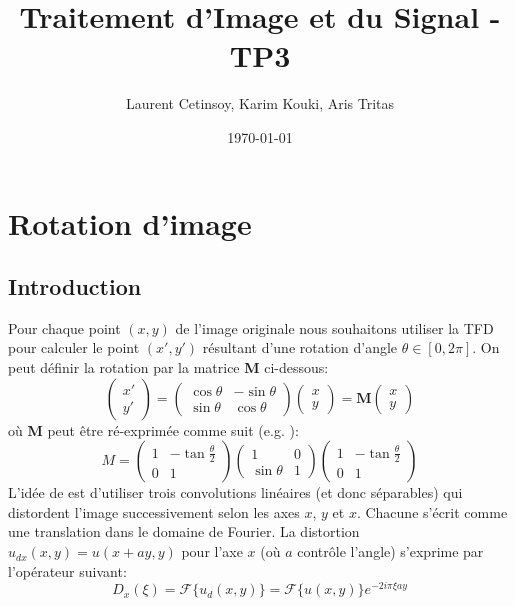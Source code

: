 \documentclass[12pt]{article}
\title{Traitement d'Image et du Signal - TP3}
\author{Laurent Cetinsoy, Karim Kouki, Aris Tritas }
\date{\today}
\begin{document}
\maketitle

\section{Rotation d'image}

\subsection{Introduction} 

Pour chaque point $(x, y)$ de l'image originale nous souhaitons utiliser la TFD pour calculer le point $(x', y')$ résultant d'une rotation d'angle  $\theta \in {[0, 2\pi]}$. On peut définir la rotation par la matrice \textbf{M} ci-dessous:
$$\begin{pmatrix}
x' \\ y'
\end{pmatrix}=
\begin{pmatrix}
\cos \theta & -\sin \theta \\
\sin \theta & \cos \theta
\end{pmatrix}
\begin{pmatrix}
x \\ y
\end{pmatrix}=\textbf{M}
\begin{pmatrix}
x \\ y
\end{pmatrix}
$$
où \textbf{M} peut être ré-exprimée comme suit (e.g. \cite{paeth86}):
$$M =
\begin{pmatrix}
1 & -\tan \frac{\theta}{2} \\
0 & 1
\end{pmatrix}
\begin{pmatrix}
1 & 0 \\
\sin \theta & 1
\end{pmatrix}
\begin{pmatrix}
1 & -\tan \frac{\theta }{2}\\
0 & 1
\end{pmatrix}
$$
L'idée de \cite{unser95} \cite{larkin97} est d'utiliser trois convolutions linéaires (et donc séparables) qui distordent l'image successivement selon les axes $x$, $y$ et $x$. 
Chacune s'écrit comme une translation dans le domaine de Fourier. La distortion $u_{dx}(x, y) = u(x + ay, y)$ pour l'axe $x$ (où $a$ contrôle l'angle) s'exprime par l'opérateur suivant:
$$ D_x(\xi) = \mathcal{F}\{u_d(x, y)\} = \mathcal{F}\{u(x, y)\} e^{-2 i \pi \xi a y}$$
\end{document}

